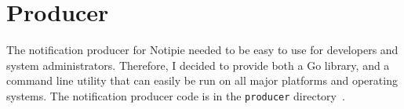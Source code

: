 \section{Producer}\label{sec:producer}

The notification producer for Notipie
needed to be easy to use for developers
and system administrators.
Therefore,
I decided to provide both a Go library,
and a command line utility
that can easily be run on all major platforms
and operating systems.
The notification producer code
is in the
\texttt{producer} directory~\cite{sewera_notipie_2022-4}.



